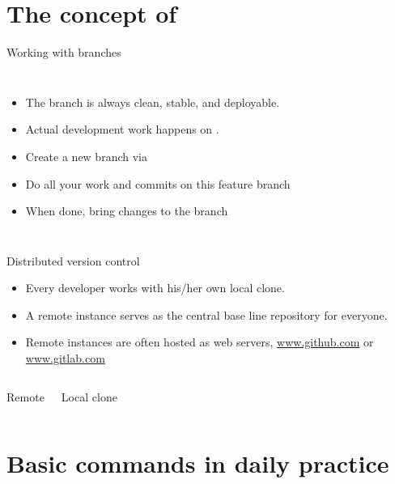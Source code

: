 \section{The concept of }

\begin{frame}{Working with branches}
\begin{columns}
\begin{itemize}
\item The  branch is always clean, stable, and deployable.
\item Actual development work happens on .
\item Create a new branch via 
\item Do all your work and commits on this feature branch 
\item When done, bring changes to the  branch
\end{itemize}
\end{columns}
\end{frame}

\begin{frame}{Distributed version control}
\begin{itemize}
\item Every developer works with his/her own local clone.
\item A remote instance serves as the central base line repository for everyone.
\item Remote instances are often hosted as web servers, {\eg} \url{www.github.com} or \url{www.gitlab.com}
\end{itemize}

\begin{columns}
\begin{block}{Remote}
\vspace{14em}
\end{block}
\begin{block}{Local clone}
\vspace{14em}
\end{block}
\end{columns}
\end{frame}

\section{Basic commands in daily practice}

